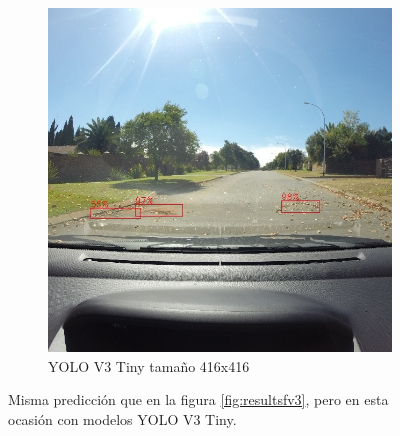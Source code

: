 \begin{figure}[H]
\begin{subfigure}[h]{0.45\linewidth}
		\includegraphics[width=\linewidth]{images/results_f_yolo_v3_tiny_416.jpg}
		\caption{YOLO V3 Tiny tamaño 416x416}
	\end{subfigure}
	\caption{Misma predicción que en la figura \ref{fig:resultsfv3}, pero en esta ocasión con modelos YOLO V3 Tiny.}
	\label{fig:resultsfv3tiny}
\end{figure}